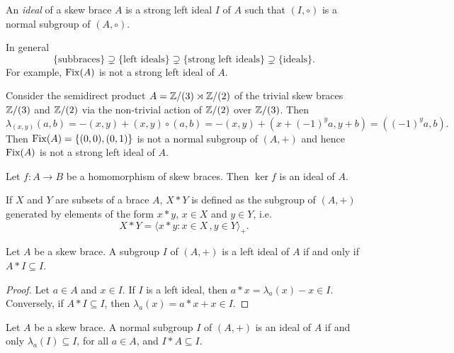 \begin{definition}
    An \emph{ideal} of a skew brace $A$ is a strong left ideal $I$ of $A$ such that 
	$(I,\circ)$ is a normal subgroup of $(A,\circ)$. 
\end{definition}

In general 
\[
\{\text{subbraces}\}\supsetneq \{\text{left ideals}\}\supsetneq\{\text{strong left ideals}\}\supsetneq\{\text{ideals}\}.
\]
For example, $\operatorname{Fix}(A)$ is not a strong left ideal of $A$.

\begin{example}
    Consider the semidirect product $A=\mathbb{Z}/(3)\rtimes \mathbb{Z}/(2)$ of the
    trivial skew braces $\mathbb{Z}/(3)$ and $\mathbb{Z}/(2)$
    via the non-trivial action of $\mathbb{Z}/(2)$ over $\mathbb{Z}/(3)$.
    Then 
    \[
    \lambda_{(x,y)}(a,b)=-(x,y)+(x,y)\circ(a,b)=-(x,y)+(x+(-1)^ya,y+b)=((-1)^ya,b).
    \]
    Then $\operatorname{Fix}(A)=\{(0,0),(0,1)\}$ is not a 
    normal subgroup of $(A,+)$ and hence $\operatorname{Fix}(A)$ is not a strong left 
    ideal of $A$.
\end{example}

\begin{example}
	Let $f\colon A\to B$ be a homomorphism of skew braces. Then $\ker f$ 
	is an ideal of $A$.
\end{example}

If $X$ and $Y$ are subsets of a brace $A$, $X*Y$ is defined as the 
subgroup of $(A,+)$ generated by elements of the form $x*y$, $x\in X$ and $y\in Y$, i.e.
\[
X*Y=\langle x*y:x\in X\,,y\in Y\rangle_+.
\]

\begin{proposition}
    \label{pro:A*I}
    Let $A$ be a skew brace. A subgroup $I$ of $(A,+)$ is 
    a left ideal of $A$ if and only if $A*I\subseteq I$.
\end{proposition}

\begin{proof}
    Let $a\in A$ and $x\in I$. If $I$ is a
    left ideal, then $a*x=\lambda_a(x)-x\in I$. Conversely, if $A*I\subseteq
    I$, then $\lambda_a(x)=a*x+x\in I$.
\end{proof}

\begin{proposition}
    \label{pro:I*A}
    Let $A$ be a skew brace. A normal subgroup $I$ of $(A,+)$
    is an ideal of $A$ if and only $\lambda_a(I)\subseteq I$, for all $a\in A$, and
    $I*A\subseteq I$.
\end{proposition}

